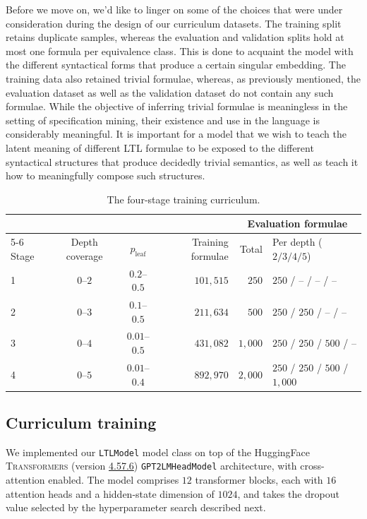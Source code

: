\documentclass[titlepage,a4paper,11pt]{report}
\begin{document}
    Before we move on, we'd like to linger on some of the choices that were under consideration during the design of our curriculum datasets. The training split retains duplicate samples, whereas the evaluation and validation splits hold at most one formula per equivalence class. This is done to acquaint the model with the different syntactical forms that produce a certain singular embedding. The training data also retained trivial formulae, whereas, as previously mentioned, the evaluation dataset as well as the validation dataset do not contain any such formulae. While the objective of inferring trivial formulae is meaningless in the setting of specification mining, their existence and use in the language is considerably meaningful. It is important for a model that we wish to teach the latent meaning of different LTL formulae to be exposed to the different syntactical structures that produce decidedly trivial semantics, as well as teach it how to meaningfully compose such structures.
    
    \begin{table}[ht]
        \centering
        \caption{The four-stage training curriculum.}
        \label{tab:curriculum}
        \begin{tabular}{lccrrl}
            \toprule
            & & & & \multicolumn{2}{c}{Evaluation formulae} \\
            \cmidrule(lr){5-6}
            Stage & Depth coverage & $p_{\text{leaf}}$ & Training formulae & Total & Per depth ($2/3/4/5$) \\
            \midrule
            1 & $0$--$2$ & $0.2$--$0.5$   & $101{,}515$ & $250$     & $250$ / -- / -- / -- \\
            2 & $0$--$3$ & $0.1$--$0.5$   & $211{,}634$ & $500$     & $250$ / $250$ / -- / -- \\
            3 & $0$--$4$ & $0.01$--$0.5$  & $431{,}082$ & $1{,}000$ & $250$ / $250$ / $500$ / -- \\
            4 & $0$--$5$ & $0.01$--$0.4$  & $892{,}970$ & $2{,}000$ & $250$ / $250$ / $500$ / $1{,}000$ \\
            \bottomrule
        \end{tabular}
    \end{table}
    
    \subsection{Curriculum training}\label{sec:curriculum_pretraining}
    We implemented our \texttt{LTLModel} model class on top of the HuggingFace \textsc{Transformers} (version \href{https://github.com/huggingface/transformers/tree/v4.57.6}{4.57.6}) \texttt{GPT2LMHeadModel} architecture, with cross-attention enabled. The model comprises $12$ transformer blocks, each with $16$ attention heads and a hidden-state dimension of $1024$, and takes the dropout value selected by the hyperparameter search described next.
    
\end{document}
